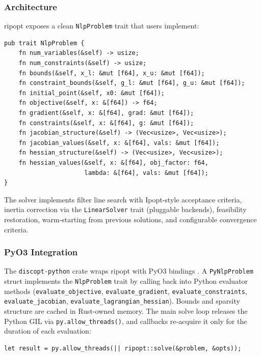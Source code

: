 \documentclass[12pt,preprint]{article}
\begin{document}
\subsubsection{Architecture}
\label{org-architecture}
ripopt exposes a clean \texttt{NlpProblem} trait that users implement:


\begin{verbatim}
pub trait NlpProblem {
    fn num_variables(&self) -> usize;
    fn num_constraints(&self) -> usize;
    fn bounds(&self, x_l: &mut [f64], x_u: &mut [f64]);
    fn constraint_bounds(&self, g_l: &mut [f64], g_u: &mut [f64]);
    fn initial_point(&self, x0: &mut [f64]);
    fn objective(&self, x: &[f64]) -> f64;
    fn gradient(&self, x: &[f64], grad: &mut [f64]);
    fn constraints(&self, x: &[f64], g: &mut [f64]);
    fn jacobian_structure(&self) -> (Vec<usize>, Vec<usize>);
    fn jacobian_values(&self, x: &[f64], vals: &mut [f64]);
    fn hessian_structure(&self) -> (Vec<usize>, Vec<usize>);
    fn hessian_values(&self, x: &[f64], obj_factor: f64,
                      lambda: &[f64], vals: &mut [f64]);
}
\end{verbatim}

The solver implements filter line search with Ipopt-style acceptance criteria, inertia correction via the \texttt{LinearSolver} trait (pluggable backends), feasibility restoration, warm-starting from previous solutions, and configurable convergence criteria.

\subsubsection{PyO3 Integration}
\label{org-pyo3-integration}
The \texttt{discopt-python} crate wraps ripopt with PyO3 bindings \cite{pyo3}. A \texttt{PyNlpProblem} struct implements the \texttt{NlpProblem} trait by calling back into Python evaluator methods (\texttt{evaluate\_objective}, \texttt{evaluate\_gradient}, \texttt{evaluate\_constraints}, \texttt{evaluate\_jacobian}, \texttt{evaluate\_lagrangian\_hessian}). Bounds and sparsity structure are cached in Rust-owned memory. The main solve loop releases the Python GIL via \texttt{py.allow\_threads()}, and callbacks re-acquire it only for the duration of each evaluation:


\begin{verbatim}
let result = py.allow_threads(|| ripopt::solve(&problem, &opts));
\end{verbatim}
\end{document}
